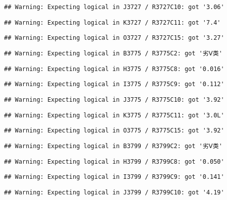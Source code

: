 \documentclass[
]{article}
\begin{document}
\begin{verbatim}
## Warning: Expecting logical in J3727 / R3727C10: got '3.06'
\end{verbatim}

\begin{verbatim}
## Warning: Expecting logical in K3727 / R3727C11: got '7.4'
\end{verbatim}

\begin{verbatim}
## Warning: Expecting logical in O3727 / R3727C15: got '3.27'
\end{verbatim}

\begin{verbatim}
## Warning: Expecting logical in B3775 / R3775C2: got '劣Ⅴ类'
\end{verbatim}

\begin{verbatim}
## Warning: Expecting logical in H3775 / R3775C8: got '0.016'
\end{verbatim}

\begin{verbatim}
## Warning: Expecting logical in I3775 / R3775C9: got '0.112'
\end{verbatim}

\begin{verbatim}
## Warning: Expecting logical in J3775 / R3775C10: got '3.92'
\end{verbatim}

\begin{verbatim}
## Warning: Expecting logical in K3775 / R3775C11: got '3.0L'
\end{verbatim}

\begin{verbatim}
## Warning: Expecting logical in O3775 / R3775C15: got '3.92'
\end{verbatim}

\begin{verbatim}
## Warning: Expecting logical in B3799 / R3799C2: got '劣Ⅴ类'
\end{verbatim}

\begin{verbatim}
## Warning: Expecting logical in H3799 / R3799C8: got '0.050'
\end{verbatim}

\begin{verbatim}
## Warning: Expecting logical in I3799 / R3799C9: got '0.141'
\end{verbatim}

\begin{verbatim}
## Warning: Expecting logical in J3799 / R3799C10: got '4.19'
\end{verbatim}
\end{document}
